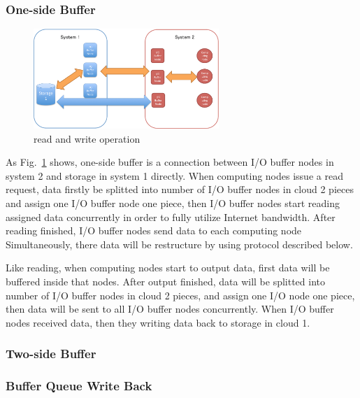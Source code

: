 \documentclass[JIP,draft]{ipsj}
\begin{document}


\subsubsection{One-side Buffer}

\begin{figure}[tb]
	\centering
	\includegraphics[width=7cm]{read_and_write}
	\caption{read and write operation}
	\label{read and write}
\end{figure}

As Fig.~\ref{read and write} shows, one-side buffer is a connection between I/O buffer nodes in system 2 and storage in system 1 directly.
When computing nodes issue a read request, data firstly be splitted into number of I/O buffer nodes in cloud 2 pieces and assign one I/O buffer node one piece, then I/O buffer nodes start reading assigned data concurrently in order to fully utilize Internet bandwidth.
After reading finished, I/O buffer nodes send data to each computing node Simultaneously, there data will be restructure by using protocol described below.

Like reading, when computing nodes start to output data, first data will be buffered inside that nodes.
After output finished, data will be splitted into number of I/O buffer nodes in cloud 2 pieces, and assign one I/O node one piece, then data will be sent to all I/O buffer nodes concurrently.
When I/O buffer nodes received data, then they writing data back to storage in cloud 1.

\subsubsection{Two-side Buffer}

\subsubsection{Buffer Queue Write Back}
\end{document}
